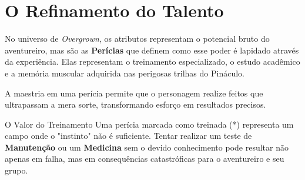 
\section*{O Refinamento do Talento}

No universo de \textit{Overgrown}, os atributos representam o potencial bruto do aventureiro, mas são as \textbf{Perícias} que definem como esse poder é lapidado através da experiência. Elas representam o treinamento especializado, o estudo acadêmico e a memória muscular adquirida nas perigosas trilhas do Pináculo.

A maestria em uma perícia permite que o personagem realize feitos que ultrapassam a mera sorte, transformando esforço em resultados precisos.

\begin{rpgboxtips}{O Valor do Treinamento}
Uma perícia marcada como treinada (*) representa um campo onde o "instinto" não é suficiente. Tentar realizar um teste de \textbf{Manutenção} ou um \textbf{Medicina} sem o devido conhecimento pode resultar não apenas em falha, mas em consequências catastróficas para o aventureiro e seu grupo.
\end{rpgboxtips}

